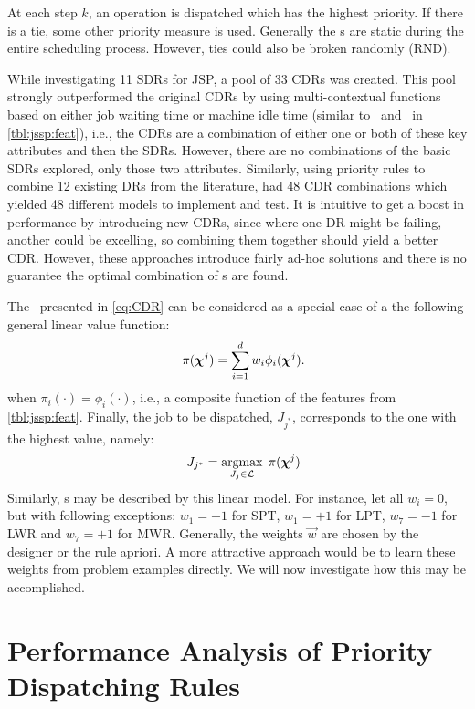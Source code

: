 \documentclass[twocolumn]{svjour3}
\begin{document}
At each step $k$, an operation is dispatched which has the highest 
priority. If there is a tie, some other priority measure is used. Generally 
the \dr s are static during the entire scheduling process. However, ties could 
also be broken randomly (RND). 

While investigating 11 SDRs for JSP, \cite{Lu13} a pool of 33 CDRs was created. 
This pool strongly outperformed the original CDRs by using multi-contextual 
functions based on either job waiting time or machine idle time (similar 
to \phiwait\ and \phimacSlack\ in \cref{tbl:jssp:feat}), i.e., the CDRs are a 
combination of either one or both of these key attributes and then the SDRs.
However, there are no combinations of the basic SDRs explored, only those two 
attributes. 
Similarly, using priority rules to combine 12 existing DRs from the literature, 
\cite{Yu13} had 48 CDR combinations which yielded 48 different models 
to implement and test. 
It is intuitive to get a boost in performance by introducing new CDRs, since 
where one DR might be failing, another could be excelling, so combining them 
together should yield a better CDR. However, these approaches introduce fairly 
ad-hoc solutions and there is no guarantee the optimal combination of 
\dr s are found.

The \cdr\ presented in \cref{eq:CDR} can be considered as a special case of a 
the following general linear value function:
\begin{equation}\quad\label{eq:jssp:linweights}
\pi(\bm \chi^j)=\sum_{i=1}^d w_i \phi_i(\bm \chi^j).
\end{equation}
when $\pi_i(\cdot)=\phi_i(\cdot)$, i.e., a composite function of the features 
from \cref{tbl:jssp:feat}. Finally, the job to be dispatched, $J_{j^*}$, 
corresponds to the one with the highest value, namely:
\begin{equation}\quad\label{eq:jstar}
J_{j^*}=\mathop{\rm argmax}_{J_j\in \mathcal{L}}\; \pi(\bm \chi^j)
\end{equation}
Similarly, \sdr s may be described by this linear model. For instance, let all 
$w_i=0$, but with following exceptions: $w_1=-1$ for SPT, $w_1=+1$ for LPT, 
$w_7=-1$ for LWR and $w_7=+1$ for MWR. Generally, the weights $\vec{w}$ are 
chosen by the designer or the 
rule apriori. A more attractive approach would be to learn these weights from 
problem examples directly. We will now investigate how this may be accomplished.

\section{Performance Analysis of Priority Dispatching Rules}\label{sec:learnOPT}
\end{document}
